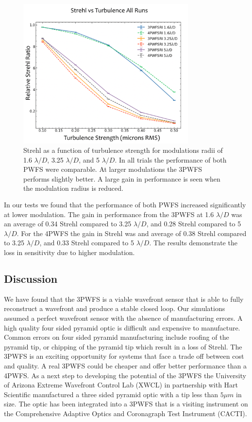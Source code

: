 \begin{figure}
    \centering
    \includegraphics[width=0.8\textwidth]{Chapter Materials/Chapter Five Materials/StrehlvsTurbRI4vs3.png}
    \caption{ Strehl as a function of turbulence strength for modulations radii of 1.6 $\lambda/D$, 3.25 $\lambda/D$, and 5 $\lambda/D$. In all trials the performance of both PWFS were comparable.  At larger modulations the 3PWFS performs slightly better. A large gain in performance is seen when the modulation radius is reduced.}
    \label{fig:results}
\end{figure}

In our tests we found that the performance of both PWFS increased significantly at lower modulation. The gain in performance from the 3PWFS at 1.6 $\lambda/D$ was an average of 0.34 Strehl compared to 3.25 $\lambda/D$, and 0.28 Strehl compared to 5 $\lambda/D$. For the 4PWFS the gain in Strehl was and average of  0.38 Strehl compared to 3.25 $\lambda/D$, and 0.33 Strehl compared to 5 $\lambda/D$. The results demonstrate the loss in sensitivity due to higher modulation. 

\subsection{Discussion}
We have found that the 3PWFS is a viable wavefront sensor that is able to fully reconstruct a wavefront and produce a stable closed loop. Our simulations assumed a perfect wavefront sensor with the absence of manufacturing errors. A high quality four sided pyramid optic is difficult and expensive to manufacture. Common errors on four sided pyramid manufacturing include roofing of the pyramid tip, or chipping of the pyramid tip which result in a loss of Strehl.  The 3PWFS is an exciting opportunity for systems that face a trade off between cost and quality. A real 3PWFS could be cheaper and offer better performance than a 4PWFS. As a next step to developing the potential of the 3PWFS the University of Arizona Extreme Wavefront Control Lab (XWCL) in partnership with Hart Scientific  manufactured a three sided pyramid optic with a tip less than $5\mu m$ in size. The optic has been integrated into a 3PWFS that is a visiting instrument on the Comprehensive Adaptive Optics and Coronagraph Test Instrument (CACTI). 
 
